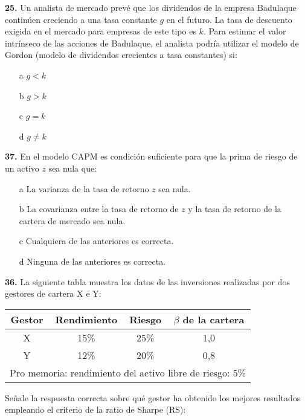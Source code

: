 \documentclass{nuevotema}
\begin{document}

\textbf{25.} Un analista de mercado prevé que los dividendos de la empresa Badulaque continúen creciendo a una tasa constante $g$ en el futuro. La tasa de descuento exigida en el mercado para empresas de este tipo es $k$. Para estimar el valor intrínseco de las acciones de Badulaque, el analista podría utilizar el modelo de Gordon (modelo de dividendos crecientes a tasa constantes) si:

\begin{itemize}
	\item[a] $g < k$
	\item[b] $g > k$
	\item[c] $g = k$
	\item[d] $g \neq k$
\end{itemize}

\textbf{37.} En el modelo CAPM es condición suficiente para que la prima de riesgo de un activo $z$ sea nula que:
\begin{enumerate}
	\item[a] La varianza de la tasa de retorno $z$ sea nula.
	\item[b] La covarianza entre la tasa de retorno de $z$ y la tasa de retorno de la cartera de mercado sea nula.
	\item[c] Cualquiera de las anteriores es correcta.
	\item[d] Ninguna de las anteriores es correcta. 
\end{enumerate}

\textbf{36.} La siguiente tabla muestra los datos de las inversiones realizadas por dos gestores de cartera X e Y:

\medskip

\begin{tabular}{| c | c | c | c |}
	\hline
	\textbf{Gestor} & \textbf{Rendimiento} & \textbf{Riesgo} & \textbf{$\beta$ de la cartera} \\ \hline
	X & 15\% & 25\% & 1,0 \\ \hline
	Y & 12\% & 20\% & 0,8 \\ \hline \hline
	\multicolumn{4}{c}{Pro memoria: rendimiento del activo libre de riesgo: 5\%} \\ \hline
\end{tabular}

\medskip

Señale la respuesta correcta sobre qué gestor ha obtenido los mejores resultados empleando el criterio de la ratio de Sharpe (RS):
\end{document}

